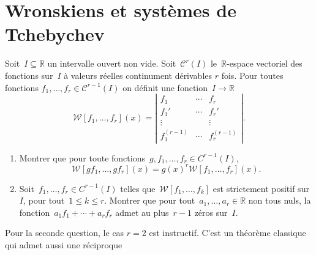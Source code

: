 \section{Wronskiens et systèmes de Tchebychev}

Soit~$I \subseteq \mathbb{R}$ un intervalle ouvert non vide.
Soit~$\mathcal{C}^r(I)$ le~$\mathbb{R}$-espace vectoriel des fonctions sur~$I$
à valeurs réelles continument dérivables $r$ fois. Pour toutes fonctions
$f_1,\dotsc,f_r \in \mathcal{C}^{r-1}(I)$
on définit une fonction~$I\to \mathbb{R}$
\[ \mathcal{W}[f_1,\dotsc,f_r](x) = \left|
    \begin{matrix}
      f_1 & \dotsb & f_r \\
      f_1' & \dotsb & f_r' \\
      \vdots & & \vdots \\
      f_1^{(r-1)} & \dotsb & f_r^{(r-1)}
    \end{matrix}
  \right|. \]

\begin{enumerate}
  \item Montrer que pour toute fonctions~$g,f_1,\dotsc,f_r \in C^{r-1}(I)$,
        \[ \mathcal{W}[gf_1,\dotsc,g f_r](x) = g(x)^r \mathcal{W}[f_1,\dotsc,f_r](x). \]


  \item Soit~$f_1,\dotsc,f_r \in C^{r-1}(I)$ telles que~$\mathcal{W}[f_1,\dotsc,f_k]$ est strictement positif sur~$I$, pour tout~$1\leq k\leq r$.
        Montrer que pour tout~$a_1,\dotsc,a_r \in \mathbb{R}$ non tous nuls, la fonction~$a_1 f_1 + \dotsb + a_r f_r$ admet au plus~$r-1$ zéros sur~$I$.
\end{enumerate}

\begin{em}
  Pour la seconde question, le cas $r=2$ est instructif.
  C'est un théorème classique qui admet aussi une réciproque \parencite[Chap.~XI, Théorème~1.2]{KarlinStudden_1966}
\end{em}

